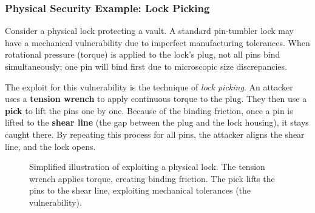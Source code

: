\subsubsection{Physical Security Example: Lock Picking}
Consider a physical lock protecting a vault. A standard pin-tumbler lock may have a mechanical vulnerability due to imperfect manufacturing tolerances. When rotational pressure (torque) is applied to the lock's plug, not all pins bind simultaneously; one pin will bind first due to microscopic size discrepancies. 

The exploit for this vulnerability is the technique of \textit{lock picking}. An attacker uses a \textbf{tension wrench} to apply continuous torque to the plug. They then use a \textbf{pick} to lift the pins one by one. Because of the binding friction, once a pin is lifted to the \textbf{shear line} (the gap between the plug and the lock housing), it stays caught there. By repeating this process for all pins, the attacker aligns the shear line, and the lock opens.

\begin{figure}[htpb]
\centering
{}
\caption{Simplified illustration of exploiting a physical lock. The tension wrench applies torque, creating binding friction. The pick lifts the pins to the shear line, exploiting mechanical tolerances (the vulnerability).}
\label{fig:lock_picking}
\end{figure}

